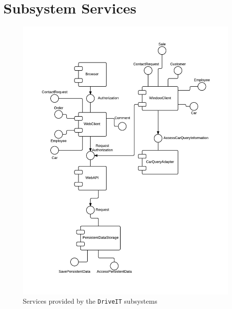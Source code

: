 \chapter{Subsystem Services}
\begin{figure}[H]
	\centering
	\includegraphics[width=\textwidth]{Figures/SubsystemServices}
	\caption{Services provided by the \texttt{DriveIT} subsystems}
	\label{fig:subsystemservices}
\end{figure}